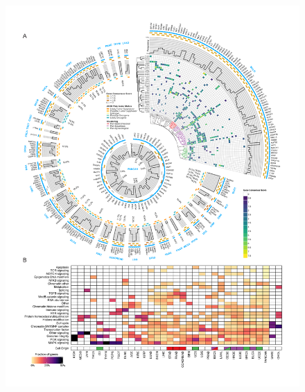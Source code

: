 \begin{figure}
  \centering
  \makeatletter
  \let\@currsize\normalsize
  \includegraphics[width=\linewidth]{figures/chapter7/cancer_driver_genes.pdf}

\end{figure}

